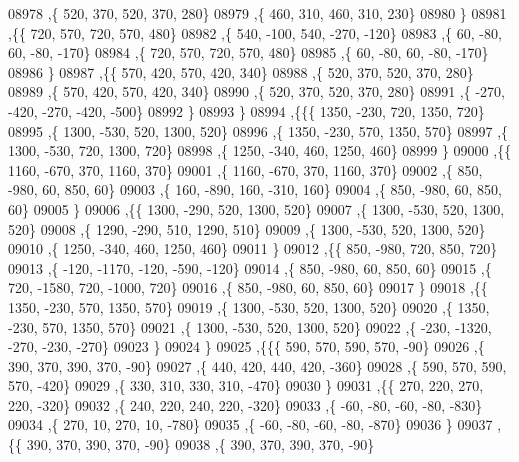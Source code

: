 \begin{DoxyCode}
08978     ,\{   520,   370,   520,   370,   280\}
08979     ,\{   460,   310,   460,   310,   230\}
08980     \}
08981    ,\{\{   720,   570,   720,   570,   480\}
08982     ,\{   540,  -100,   540,  -270,  -120\}
08983     ,\{    60,   -80,    60,   -80,  -170\}
08984     ,\{   720,   570,   720,   570,   480\}
08985     ,\{    60,   -80,    60,   -80,  -170\}
08986     \}
08987    ,\{\{   570,   420,   570,   420,   340\}
08988     ,\{   520,   370,   520,   370,   280\}
08989     ,\{   570,   420,   570,   420,   340\}
08990     ,\{   520,   370,   520,   370,   280\}
08991     ,\{  -270,  -420,  -270,  -420,  -500\}
08992     \}
08993    \}
08994   ,\{\{\{  1350,  -230,   720,  1350,   720\}
08995     ,\{  1300,  -530,   520,  1300,   520\}
08996     ,\{  1350,  -230,   570,  1350,   570\}
08997     ,\{  1300,  -530,   720,  1300,   720\}
08998     ,\{  1250,  -340,   460,  1250,   460\}
08999     \}
09000    ,\{\{  1160,  -670,   370,  1160,   370\}
09001     ,\{  1160,  -670,   370,  1160,   370\}
09002     ,\{   850,  -980,    60,   850,    60\}
09003     ,\{   160,  -890,   160,  -310,   160\}
09004     ,\{   850,  -980,    60,   850,    60\}
09005     \}
09006    ,\{\{  1300,  -290,   520,  1300,   520\}
09007     ,\{  1300,  -530,   520,  1300,   520\}
09008     ,\{  1290,  -290,   510,  1290,   510\}
09009     ,\{  1300,  -530,   520,  1300,   520\}
09010     ,\{  1250,  -340,   460,  1250,   460\}
09011     \}
09012    ,\{\{   850,  -980,   720,   850,   720\}
09013     ,\{  -120, -1170,  -120,  -590,  -120\}
09014     ,\{   850,  -980,    60,   850,    60\}
09015     ,\{   720, -1580,   720, -1000,   720\}
09016     ,\{   850,  -980,    60,   850,    60\}
09017     \}
09018    ,\{\{  1350,  -230,   570,  1350,   570\}
09019     ,\{  1300,  -530,   520,  1300,   520\}
09020     ,\{  1350,  -230,   570,  1350,   570\}
09021     ,\{  1300,  -530,   520,  1300,   520\}
09022     ,\{  -230, -1320,  -270,  -230,  -270\}
09023     \}
09024    \}
09025   ,\{\{\{   590,   570,   590,   570,   -90\}
09026     ,\{   390,   370,   390,   370,   -90\}
09027     ,\{   440,   420,   440,   420,  -360\}
09028     ,\{   590,   570,   590,   570,  -420\}
09029     ,\{   330,   310,   330,   310,  -470\}
09030     \}
09031    ,\{\{   270,   220,   270,   220,  -320\}
09032     ,\{   240,   220,   240,   220,  -320\}
09033     ,\{   -60,   -80,   -60,   -80,  -830\}
09034     ,\{   270,    10,   270,    10,  -780\}
09035     ,\{   -60,   -80,   -60,   -80,  -870\}
09036     \}
09037    ,\{\{   390,   370,   390,   370,   -90\}
09038     ,\{   390,   370,   390,   370,   -90\}

\end{DoxyCode}
